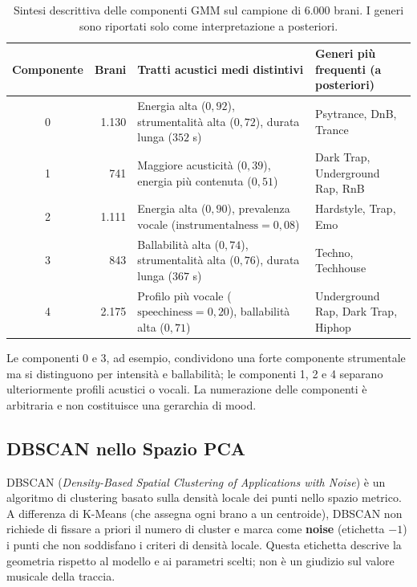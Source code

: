 \begin{table}[H]
\centering
\caption{Sintesi descrittiva delle componenti GMM sul campione di 6.000 brani. I generi sono riportati solo come interpretazione a posteriori.}
\label{tab:gmm_profile}
\vspace{0.2cm}
\small
\begin{tabularx}{\textwidth}{c r X X}
\toprule
\textbf{Componente} & \textbf{Brani} & \textbf{Tratti acustici medi distintivi} & \textbf{Generi più frequenti (a posteriori)} \\
\midrule
0 & 1.130 & Energia alta ($0,92$), strumentalità alta ($0,72$), durata lunga ($352$ s) & Psytrance, DnB, Trance \\
1 & 741 & Maggiore acusticità ($0,39$), energia più contenuta ($0,51$) & Dark Trap, Underground Rap, RnB \\
2 & 1.111 & Energia alta ($0,90$), prevalenza vocale ($\text{instrumentalness}=0,08$) & Hardstyle, Trap, Emo \\
3 & 843 & Ballabilità alta ($0,74$), strumentalità alta ($0,76$), durata lunga ($367$ s) & Techno, Techhouse \\
4 & 2.175 & Profilo più vocale ($\text{speechiness}=0,20$), ballabilità alta ($0,71$) & Underground Rap, Dark Trap, Hiphop \\
\bottomrule
\end{tabularx}
\end{table}

Le componenti 0 e 3, ad esempio, condividono una forte componente strumentale ma si distinguono per intensità e ballabilità; le componenti 1, 2 e 4 separano ulteriormente profili acustici o vocali. La numerazione delle componenti è arbitraria e non costituisce una gerarchia di mood.

\newpage
\subsection{DBSCAN nello Spazio PCA}

DBSCAN (\textit{Density-Based Spatial Clustering of Applications with Noise}) è un algoritmo di clustering basato sulla densità locale dei punti nello spazio metrico. A differenza di K-Means (che assegna ogni brano a un centroide), DBSCAN non richiede di fissare a priori il numero di cluster e marca come \textbf{noise} (etichetta $-1$) i punti che non soddisfano i criteri di densità locale. Questa etichetta descrive la geometria rispetto al modello e ai parametri scelti; non è un giudizio sul valore musicale della traccia.

